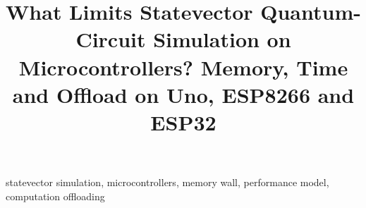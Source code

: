 \documentclass[conference]{IEEEtran}
\newif\ifblind
\begin{document}
\title{What Limits Statevector Quantum-Circuit Simulation on Microcontrollers? Memory, Time and Offload on Uno, ESP8266 and ESP32}
\ifblind
\author{\IEEEauthorblockN{Anonymous submission}}
\else
\author{}
\fi
\maketitle
\begin{abstract}

\end{abstract}
\begin{IEEEkeywords}
statevector simulation, microcontrollers, memory wall, performance model, computation offloading
\end{IEEEkeywords}









\end{document}

